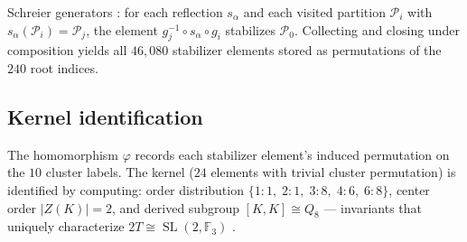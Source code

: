 \documentclass[11pt,reqno]{amsart}
\theoremstyle{plain}
\theoremstyle{definition}
\theoremstyle{remark}
\newcommand{\F}{\mathbb{F}}
\DeclareMathOperator{\SL}{SL}
\begin{document}
Schreier generators \cite{Sims1970}: for each reflection
$s_\alpha$ and each visited partition $\mathcal{P}_i$ with
$s_\alpha(\mathcal{P}_i) = \mathcal{P}_j$, the element
$g_j^{-1} \circ s_\alpha \circ g_i$ stabilizes
$\mathcal{P}_0$.
Collecting and closing under composition yields all
$46{,}080$ stabilizer elements stored as permutations
of the $240$ root indices.

\subsection{Kernel identification}

The homomorphism $\varphi$ records each stabilizer element's
induced permutation on the $10$ cluster labels.
The kernel ($24$ elements with trivial cluster permutation)
is identified by computing:
order distribution
$\{1{:}1,\; 2{:}1,\; 3{:}8,\; 4{:}6,\; 6{:}8\}$,
center order $|Z(K)| = 2$,
and derived subgroup $[K,K] \cong Q_8$ ---
invariants that uniquely characterize
$2T \cong \SL(2,\F_3)$ \cite{ConwaySloanePlesken1988}.
\end{document}
